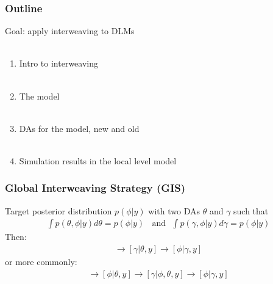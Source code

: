 \documentclass[xcolor=dvipsnames]{beamer}
\begin{document}
\begin{frame}
  \frametitle{Outline}
  Goal: apply interweaving to DLMs\\~\\
  \begin{enumerate}
    \item Intro to interweaving\\~\\
    \item The model\\~\\
    \item DAs for the model, new and old\\~\\
    \item Simulation results in the local level model
  \end{enumerate}
\end{frame}

\begin{frame}
\frametitle{Global Interweaving Strategy (GIS)}
Target posterior distribution $p(\phi|y)$ with two DAs $\theta$ and $\gamma$ such that
\begin{align*}
\int p(\theta,\phi|y) d\theta = p(\phi|y) \ \ \ \ \mbox{and}\ \ \ \int p(\gamma,\phi|y) d\gamma = p(\phi|y) 
\end{align*}
Then:
\begin{align*}
[\theta|\phi,y] \to [\gamma|\theta,y] \to [\phi|\gamma,y]
\end{align*}
or more commonly:
\begin{align*}
[\theta|\phi,y] \to [\phi|\theta,y] \to [\gamma|\phi,\theta,y] \to [\phi|\gamma,y]
\end{align*}
\end{frame}
\end{document}
